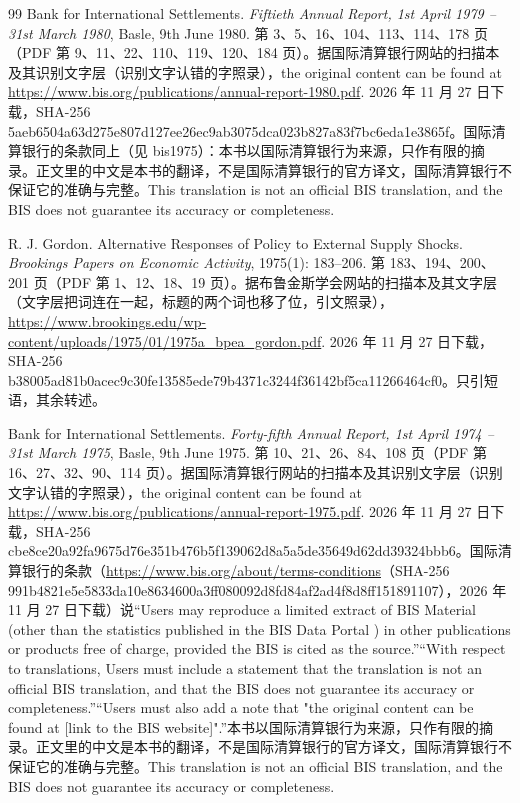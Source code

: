 \begin{thebibliography}{99}
 Bank for International Settlements. \emph{Fiftieth Annual Report, 1st April 1979 -- 31st March 1980}, Basle, 9th June 1980. 第 3、5、16、104、113、114、178 页（PDF 第 9、11、22、110、119、120、184 页）。据国际清算银行网站的扫描本及其识别文字层（识别文字认错的字照录），the original content can be found at \url{https://www.bis.org/publications/annual-report-1980.pdf}. 2026 年 11 月 27 日下载，SHA-256 5aeb6504a63d275e807d127ee26ec9ab3075dca023b827a83f7bc6eda1e3865f。国际清算银行的条款同上（见 bis1975）：本书以国际清算银行为来源，只作有限的摘录。正文里的中文是本书的翻译，不是国际清算银行的官方译文，国际清算银行不保证它的准确与完整。This translation is not an official BIS translation, and the BIS does not guarantee its accuracy or completeness.

 R. J. Gordon. Alternative Responses of Policy to External Supply Shocks. \emph{Brookings Papers on Economic Activity}, 1975(1): 183--206. 第 183、194、200、201 页（PDF 第 1、12、18、19 页）。据布鲁金斯学会网站的扫描本及其文字层（文字层把词连在一起，标题的两个词也移了位，引文照录），\url{https://www.brookings.edu/wp-content/uploads/1975/01/1975a_bpea_gordon.pdf}. 2026 年 11 月 27 日下载，SHA-256 b38005ad81b0acec9c30fe13585ede79b4371c3244f36142bf5ca11266464cf0。只引短语，其余转述。

 Bank for International Settlements. \emph{Forty-fifth Annual Report, 1st April 1974 -- 31st March 1975}, Basle, 9th June 1975. 第 10、21、26、84、108 页（PDF 第 16、27、32、90、114 页）。据国际清算银行网站的扫描本及其识别文字层（识别文字认错的字照录），the original content can be found at \url{https://www.bis.org/publications/annual-report-1975.pdf}. 2026 年 11 月 27 日下载，SHA-256 cbe8ce20a92fa9675d76e351b476b5f139062d8a5a5de35649d62dd39324bbb6。国际清算银行的条款（\url{https://www.bis.org/about/terms-conditions}（SHA-256 991b4821e5e5833da10e8634600a3ff080092d8fd84af2ad4f8d8ff151891107），2026 年 11 月 27 日下载）说“Users may reproduce a limited extract of BIS Material (other than the statistics published in the BIS Data Portal ) in other publications or products free of charge, provided the BIS is cited as the source.”“With respect to translations, Users must include a statement that the translation is not an official BIS translation, and that the BIS does not guarantee its accuracy or completeness.”“Users must also add a note that "the original content can be found at [link to the BIS website]".”本书以国际清算银行为来源，只作有限的摘录。正文里的中文是本书的翻译，不是国际清算银行的官方译文，国际清算银行不保证它的准确与完整。This translation is not an official BIS translation, and the BIS does not guarantee its accuracy or completeness.


\end{thebibliography}
